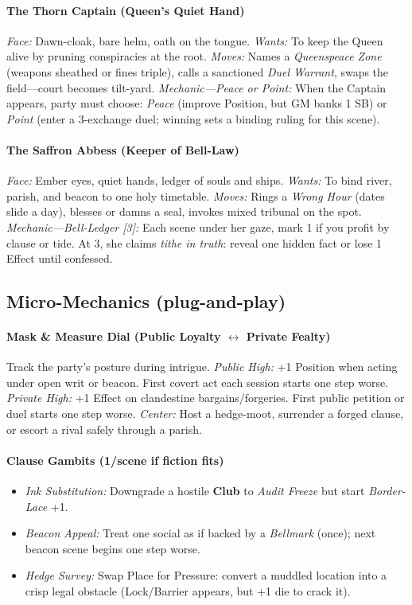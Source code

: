 \paragraph*{The Thorn Captain (Queen’s Quiet Hand)}
\emph{Face:} Dawn-cloak, bare helm, oath on the tongue.  
\emph{Wants:} To keep the Queen alive by pruning conspiracies at the root.  
\emph{Moves:} Names a \emph{Queenspeace Zone} (weapons sheathed or fines triple), calls a sanctioned \emph{Duel Warrant}, swaps the field—court becomes tilt-yard.  
\emph{Mechanic—Peace or Point:} When the Captain appears, party must choose: \emph{Peace} (improve Position, but GM banks 1 SB) or \emph{Point} (enter a 3-exchange duel; winning sets a binding ruling for this scene).

\paragraph*{The Saffron Abbess (Keeper of Bell-Law)}
\emph{Face:} Ember eyes, quiet hands, ledger of souls and ships.  
\emph{Wants:} To bind river, parish, and beacon to one holy timetable.  
\emph{Moves:} Rings a \emph{Wrong Hour} (dates slide a day), blesses or damns a seal, invokes mixed tribunal on the spot.  
\emph{Mechanic—Bell-Ledger [3]:} Each scene under her gaze, mark 1 if you profit by clause or tide. At 3, she claims \emph{tithe in truth}: reveal one hidden fact or lose 1 Effect until confessed.

\subsection*{Micro-Mechanics (plug-and-play)}
\paragraph*{Mask \& Measure Dial (Public Loyalty \(\leftrightarrow\) Private Fealty)}
Track the party’s posture during intrigue.  
\emph{Public High:} +1 Position when acting under open writ or beacon. First covert act each session starts one step worse.  
\emph{Private High:} +1 Effect on clandestine bargains/forgeries. First public petition or duel starts one step worse.  
\emph{Center:} Host a hedge-moot, surrender a forged clause, or escort a rival safely through a parish.

\paragraph*{Clause Gambits (1/scene if fiction fits)}
\begin{itemize}
  \item \emph{Ink Substitution:} Downgrade a hostile \textbf{Club} to \emph{Audit Freeze} but start \emph{Border-Lace} +1.
  \item \emph{Beacon Appeal:} Treat one social as if backed by a \emph{Bellmark} (once); next beacon scene begins one step worse.
  \item \emph{Hedge Survey:} Swap Place for Pressure: convert a muddled location into a crisp legal obstacle (Lock/Barrier appears, but +1 die to crack it).
\end{itemize}

